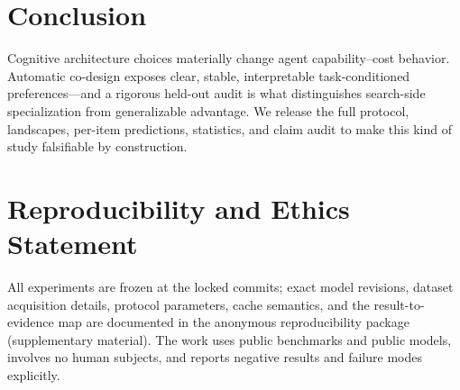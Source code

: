 \documentclass[11pt]{article}
\begin{document}
\section{Conclusion}

Cognitive architecture choices materially change agent capability--cost
behavior. Automatic co-design exposes clear, stable, interpretable
task-conditioned preferences---and a rigorous held-out audit is what
distinguishes search-side specialization from generalizable advantage. We
release the full protocol, landscapes, per-item predictions, statistics, and
claim audit to make this kind of study falsifiable by construction.

\section{Reproducibility and Ethics Statement}
\label{sec:repro}

All experiments are frozen at the locked commits; exact model revisions,
dataset acquisition details, protocol parameters, cache semantics, and the
result-to-evidence map are documented in the anonymous reproducibility
package (supplementary material). The work uses public benchmarks and public
models, involves no human subjects, and reports negative results and failure
modes explicitly.


\end{document}
